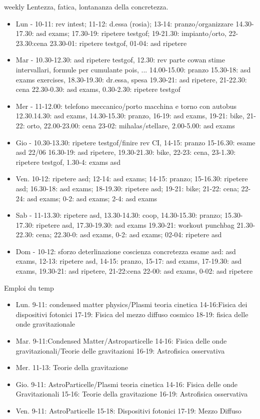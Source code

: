 \documentclass[10pt,xcolor={usenames},fleqn,mathserif,serif]{beamer}
\begin{document}
\begin{frame}[allowframebreaks]{weekly}
Lentezza, fatica, lontananza della concretezza. 
\begin{itemize}
    \item Lun - 10-11: rev intest; 11-12: d.essa (rosia); 13-14: pranzo/organizzare 14.30-17.30: asd exams; 17.30-19: ripetere testgof; 19-21.30: impianto/orto, 22-23.30:cena 23.30-01: ripetere testgof, 01-04: asd ripetere
    \item Mar - 10.30-12.30: asd ripetere testgof, 12.30: rev parte cowan stime intervallari, formule per cumulante pois, ... 14.00-15.00: pranzo 15.30-18: asd exams exercises, 18.30-19.30: dr.essa, spesa 19.30-21: asd ripetere, 21-22.30: cena 22.30-0.30: asd exams, 0.30-2.30: ripetere testgof
    \item Mer - 11-12.00: telefono meccanico/porto macchina e torno con autobus 12.30.14.30: asd exams, 14.30-15.30: pranzo, 16-19: asd exams, 19-21: bike, 21-22: orto, 22.00-23.00: cena 23-02: mihalas/stellare, 2.00-5.00: asd exams
    \item Gio - 10.30-13.30: ripetere testgof/finire rev CI, 14-15: pranzo 15-16.30: esame asd 22/06 16.30-19: asd ripetere, 19.30-21.30: bike, 22-23: cena, 23-1.30: ripetere testgof, 1.30-4: exams asd
    \item Ven. 10-12: ripetere asd; 12-14: asd exams; 14-15: pranzo; 15-16.30: ripetere asd; 16.30-18: asd exams; 18-19.30: ripetere asd; 19-21: bike; 21-22: cena; 22-24: asd exams; 0-2: asd exams; 2-4: asd exams
    \item Sab - 11-13.30: ripetere asd, 13.30-14.30: coop, 14.30-15.30: pranzo; 15.30-17.30: ripetere asd, 17.30-19.30: asd exams 19.30-21: workout punchbag 21.30-22.30: cena; 22.30-0: asd exams, 0-2: asd exams; 02-04: ripetere asd
    \item Dom - 10-12: sforzo deterlinazione coscienza concretezza esame asd: asd exams, 12-13: ripetere asd, 14-15: pranzo, 15-17: asd exams, 17-19.30: asd exams, 19.30-21: asd ripetere, 21-22:cena 22-00: asd exams, 0-02: asd ripetere
\end{itemize}
\end{frame}

\begin{frame}[label={why}]{Emploi du temp}
\begin{itemize}
    \item Lun. 9-11: condensed matter physics/Plasmi teoria cinetica 14-16:Fisica dei dispositivi fotonici 17-19: Fisica del mezzo diffuso cosmico 18-19: fisica delle onde gravitazionale
    \item Mar. 9-11:Condensed Matter/Astroparticelle 14-16: Fisica delle onde gravitazionali/Teorie delle gravitazioni 16-19: Astrofisica osservativa
    \item Mer. 11-13: Teorie della gravitazione
    \item Gio. 9-11: AstroParticelle/Plasmi teoria cinetica 14-16: Fisica delle onde Gravitazionali 15-16: Teorie della gravitazione 16-19: Astrofisica osservativa
    \item Ven. 9-11: AstroParticelle 15-18: Dispositivi fotonici 17-19: Mezzo Diffuso
\end{itemize}
\end{frame}
\end{document}
